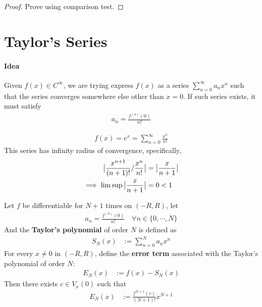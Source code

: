 \documentclass[11pt]{article}
\begin{document}
 	\begin{proof}
 		Prove using comparison test.
 	\end{proof}
 	
 	\section{Taylor's Series}
 	\paragraph{Idea} Given $f(x) \in C^\infty$, we are trying express $f(x)$ as a series $\sum_{n=0}^\infty a_n x^n$ such that the series converges somewhere else other than $x=0$. If such series exists, it must satisfy
 	\begin{align}
 		a_n = \frac{f^{(n)}(0)}{n!}
 	\end{align}
 	
 	\begin{example}
 		\begin{align}
 			f(x) = e^x = \sum_{n=0}^\infty \frac{x^n}{n!}
 		\end{align}
 		This series has infinity radius of convergence, specifically,
 		\begin{align}
 			\big \vert {\frac{x^{n+1}}{(n+1)!} / \frac{x^n}{n!}} \big \vert &= \big \vert {\frac{x}{n+1}} \big \vert \\
 			\implies \limsup \big \vert {\frac{x}{n+1}} \big \vert &= 0 < 1
 		\end{align}
 	\end{example}
 	
 	\begin{theorem}
 		Let $f$ be differentiable for $N+1$ times on $(-R, R)$, let 
 		\begin{align}
 			a_n = \frac{f^{(n)}(0)}{n!}\quad \forall n \in \{0, \cdots, N\}
 		\end{align}
 		And the \textbf{Taylor's polynomial} of order $N$ is defined as
 		\begin{align}
 			S_N(x) &:= \sum_{n=0}^N a_n x^n
 		\end{align}
 		For every $x \neq 0$ in $(-R, R)$, define the \textbf{error term} associated with the Taylor's polynomial of order $N$:
 		\begin{align}
 			E_N(x) &:= f(x) - S_N(x)
 		\end{align}
 		Then there exists $c \in V_x(0)$ such that 
 		\begin{align}
 			E_N(x) &:= \frac{f^{N+1}(c)}{(N+1)!} x^{N+1}
 		\end{align}
 	\end{theorem}
 	
\end{document}
